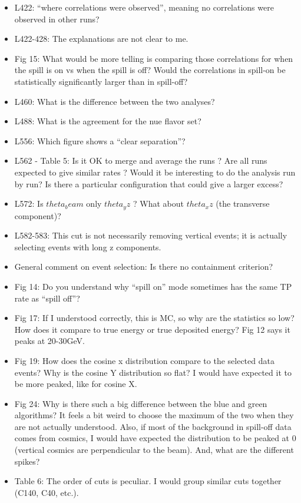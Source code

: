 \documentclass[11pt]{article}
\begin{document}
\begin{itemize}
    \item L422: “where correlations were observed”, meaning no correlations were observed in other runs?
    \item L422-428: The explanations are not clear to me.
    \item Fig 15: What would be more telling is comparing those correlations for when the spill is on vs when the spill is off? Would the correlations in spill-on be statistically significantly larger than in spill-off?
    \item L460: What is the difference between the two analyses?
    \item L488: What is the agreement for the nue flavor set?
    \item L556: Which figure shows a “clear separation”?
    \item L562 - Table 5: Is it OK to merge and average the runs ? Are all runs expected to give similar rates ? Would it be interesting to do the analysis run by run? Is there a particular configuration that could give a larger excess?
    \item L572: Is $theta_beam$ only $theta_yz$ ? What about $theta_xz$ (the transverse component)?
    \item L582-583: This cut is not necessarily removing vertical events; it is actually selecting events with long z components.
    \item General comment on event selection: Is there no containment criterion?
    \item Fig 14: Do you understand why “spill on” mode sometimes has the same TP rate as “spill off”?
    \item Fig 17: If I understood correctly, this is MC, so why are the statistics so low? How does it compare to true energy or true deposited energy? Fig 12 says it peaks at 20-30GeV.
    \item Fig 19: How does the cosine x distribution compare to the selected data events? Why is the cosine Y distribution so flat? I would have expected it to be more peaked, like for cosine X.
    \item Fig 24: Why is there such a big difference between the blue and green algorithms? It feels a bit weird to choose the maximum of the two when they are not actually understood. Also, if most of the background in spill-off data comes from cosmics, I would have expected the distribution to be peaked at 0 (vertical cosmics are perpendicular to the beam). And, what are the different spikes?   
    \item Table 6: The order of cuts is peculiar. I would group similar cuts together (C140, C40, etc.).

\end{itemize}
\end{document}
